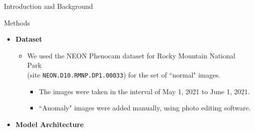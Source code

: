 \documentclass[final,hyperref={pdfpagelabels=false}]{beamer}
\begin{document}
\begin{frame}[t]
\begin{columns}[t]
\begin{column}{.465\textwidth}
\begin{block}{Introduction and Background}
\begin{itemize}
%
%
%
%
\end{itemize}
\end{block}



\begin{block}{Methods}

\begin{itemize}
\item \textbf{Dataset}
\begin{itemize}
\item We used the NEON Phenocam dataset for Rocky Mountain National Park \\ (site \texttt{NEON.D10.RMNP.DP1.00033}) for the set of ``normal" images.\\
\begin{itemize}
\item The images were taken in the interval of May 1, 2021 to June 1, 2021.
\item ``Anomaly" images were added manually, using photo editing software.\\[6mm]
\end{itemize}
\end{itemize}

\bigskip
\item \textbf {Model Architecture}\\[1cm]


\end{itemize}
\end{block}
\end{column}
\end{columns}
\end{frame}
\end{document}
